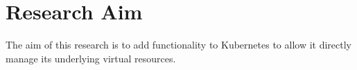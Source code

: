\chapter{Research Aim}
The aim of this research is to add functionality to Kubernetes to allow it directly manage its underlying virtual resources.

